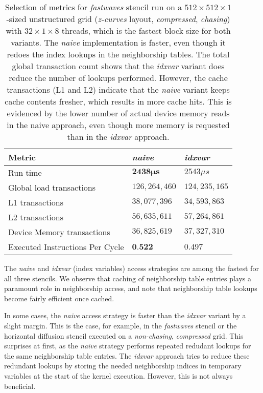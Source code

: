 \begin{table}
	\begin{center}
    \begin{tabular}{l l l}
        \hline
        \textbf{Metric} & \textbf{\emph{naive}} & \textbf{\emph{idxvar}} \\
        \hline
        \hline
        Run time & $\mathbf{2438\mu s}$ & $2543\mu s$ \\
        Global load transactions & $126,264,460$ & $124,235,165$ \\
        L1 transactions & $38,077,396$ & $34,593,863$ \\
        L2 transactions & $56,635,611$ & $57,264,861$ \\
        Device Memory transactions & $36,825,619$ & $37,327,310$ \\
        Executed Instructions Per Cycle & $\textbf{0.522}$ & $0.497$ \\
        \hline
    \end{tabular}
	\end{center}
    \caption{\label{tab:fastwaves-naive-idxvar-metrics}Selection of metrics for \emph{fastwaves} stencil run on a $512\times 512\times 1$-sized unstructured grid (\emph{z-curves} layout, \emph{compressed}, \emph{chasing}) with $32\times 1\times 8$ threads, which is the fastest block size for both variants. The \emph{naive} implementation is faster, even though it redoes the index lookups in the neighborship tables. The total global transaction count shows that the \emph{idxvar} variant does reduce the number of lookups performed. However, the cache transactions (L1 and L2) indicate that the \emph{naive} variant keeps cache contents fresher, which results in more cache hits. This is evidenced by the lower number of actual device memory reads in the naive approach, even though more memory is requested than in the \emph{idxvar} approach.}
\end{table}

The \emph{naive} and \emph{idxvar} (index variables) access strategies are among the fastest for all three stencils. We observe that caching of neighborship table entries plays a paramount role in neighborship access, and note that neighborship table lookups become fairly efficient once cached.

In some cases, the \emph{naive} access strategy is faster than the \emph{idxvar} variant by a slight margin. This is the case, for example, in the \emph{fastwaves} stencil or the horizontal diffusion stencil executed on a \emph{non-chasing}, \emph{compressed} grid. This surprises at first, as the \emph{naive} strategy performs repeated redudant lookups for the same neighborship table entries. The \emph{idxvar} approach tries to reduce these redundant lookups by storing the needed neighborship indices in temporary variables at the start of the kernel execution. However, this is not always beneficial.

